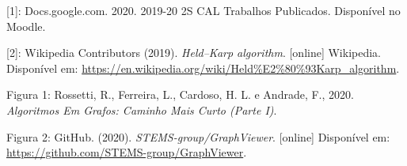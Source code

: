\documentclass[article, a4paper, 12pt, oneside]{memoir}
\begin{document}
[1]: Docs.google.com. 2020. 2019-20 2S CAL Trabalhos Publicados. Disponível no Moodle.

[2]: Wikipedia Contributors (2019). \textit{Held–Karp algorithm}. [online] Wikipedia. Disponível em: \url{https://en.wikipedia.org/wiki/Held%E2%80%93Karp_algorithm}.

Figura 1: Rossetti, R., Ferreira, L., Cardoso, H. L. e Andrade, F., 2020. \textit{Algoritmos Em Grafos: Caminho Mais Curto (Parte I)}.

Figura 2: GitHub. (2020). \textit{STEMS-group/GraphViewer}. [online] Disponível em: \url{https://github.com/STEMS-group/GraphViewer}.

‌

‌

\newpage
\end{document}
